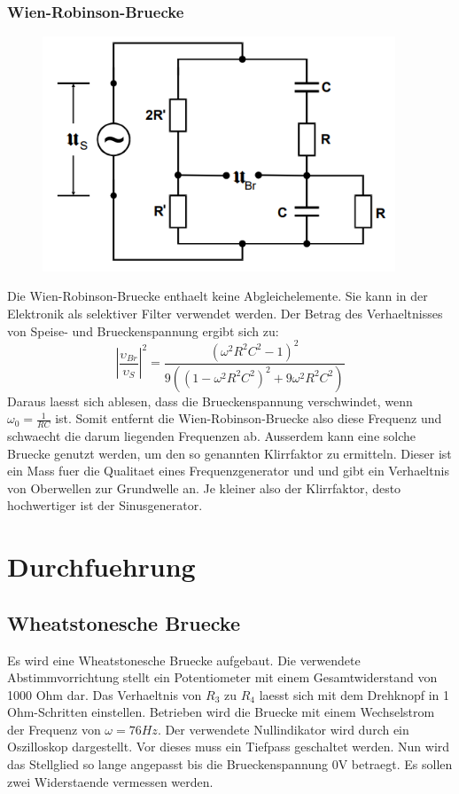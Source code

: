 \subsubsection{Wien-Robinson-Bruecke}
\begin{figure}[H]
    \centering
    \captionsetup{justification=centering}
    \includegraphics[height=7cm]{"Wien_Brueckenschaltung.png"}
    \label{Fig:Wien}
\end{figure}
Die Wien-Robinson-Bruecke enthaelt keine Abgleichelemente. Sie kann in der Elektronik als selektiver Filter verwendet werden. Der Betrag des Verhaeltnisses von Speise- und Brueckenspannung ergibt sich zu:
\begin{equation}
    |\frac{\upsilon_{Br}}{\upsilon_S}|^2=\frac{(\omega^2R^2C^2-1)^2}{9((1-\omega^2R^2C^2)^2+9\omega^2R^2C^2)}
\end{equation}
Daraus laesst sich ablesen, dass die Brueckenspannung verschwindet, wenn $\omega_0=\frac{1}{RC}$ ist. Somit entfernt die Wien-Robinson-Bruecke also diese Frequenz und schwaecht die darum liegenden Frequenzen ab.
Ausserdem kann eine solche Bruecke genutzt werden, um den so genannten Klirrfaktor zu ermitteln. Dieser ist ein Mass fuer die Qualitaet eines Frequenzgenerator und und gibt ein Verhaeltnis von Oberwellen zur Grundwelle an. Je kleiner also der Klirrfaktor, desto hochwertiger ist der Sinusgenerator. 
\section{Durchfuehrung}
\subsection{Wheatstonesche Bruecke}
Es wird eine Wheatstonesche Bruecke aufgebaut. Die verwendete Abstimmvorrichtung stellt ein Potentiometer mit einem Gesamtwiderstand von 1000 Ohm dar. Das Verhaeltnis von $R_3$ zu $R_4$ laesst sich mit dem Drehknopf in 1 Ohm-Schritten einstellen. Betrieben wird die Bruecke mit einem Wechselstrom der Frequenz von $\omega=76 Hz$. Der verwendete Nullindikator wird durch ein Oszilloskop dargestellt. Vor dieses muss ein Tiefpass geschaltet werden. Nun wird das Stellglied so lange angepasst bis die Brueckenspannung 0V betraegt. Es sollen zwei Widerstaende vermessen werden.
